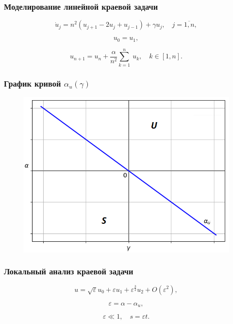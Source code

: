 \documentclass[fullscreen=true, unicode, bookmarks=false]{beamer}
\begin{document}
\begin{frame}
\frametitle{ Моделирование линейной краевой задачи }

\begin{equation}\label{numeric_problem} 
	\dot{u}_j =  n^2(u_{j+1} - 2u_j + u_{j-1}) + \gamma u_j, \quad j = \overline{1, n}, 
\end{equation}

\vfill

$$ u_0 = u_1, $$

$$ u_{n+1} = u_n + \frac{\alpha}{n^2} \sum_{k=1}^{n} \:u_k, \quad k \in [1,n]. $$

\end{frame}

\begin{frame}
\frametitle{ График кривой $ \alpha_u(\gamma) $ }

\begin{figure}[h]
\includegraphics[scale=0.6]{alpha_u.png} 
\end{figure}

\end{frame}

\begin{frame}
\frametitle{ Локальный анализ краевой задачи }

\begin{equation}
	u = \sqrt{\varepsilon}u_0 + \varepsilon u_1 + \varepsilon^{\frac{3}{2}} u_2 + O(\varepsilon^2),
\end{equation}

\bigskip

$$ \varepsilon = \alpha - \alpha_u, $$

$$ \varepsilon \ll 1, \quad s = \varepsilon t. $$

\end{frame}
\end{document}
